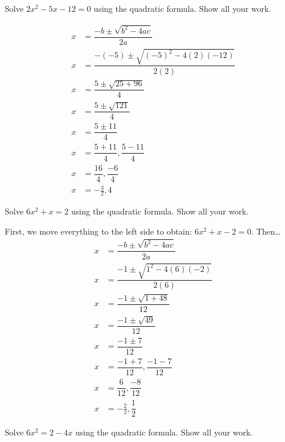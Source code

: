 \documentclass[11pt,letterpaper]{article}
\begin{document}
\newpage





 Solve $2x^2 - 5x - 12= 0$ using the quadratic formula. Show all your work. \pspace

\sol
	\[
	\begin{aligned}
	x&= \dfrac{-b \pm \sqrt{b^2 - 4ac}}{2a} \\[0.3cm]
	x&= \dfrac{-(-5) \pm \sqrt{(-5)^2 - 4(2)(-12)}}{2(2)} \\[0.3cm]
	x&= \dfrac{5 \pm \sqrt{25 + 96}}{4} \\[0.3cm]
	x&= \dfrac{5 \pm \sqrt{121}}{4} \\[0.3cm]
	x&= \dfrac{5 \pm 11}{4} \\[0.3cm]
	x&= \dfrac{5 + 11}{4}, \dfrac{5 - 11}{4} \\[0.3cm]
	x&= \dfrac{16}{4}, \dfrac{-6}{4} \\[0.3cm]
	x&= -\frac{3}{2}, 4
	\end{aligned}
	\] 





\newpage





 Solve $6x^2 + x= 2$ using the quadratic formula. Show all your work. \pspace

\sol First, we move everything to the left side to obtain: $6x^2 + x - 2= 0$. Then\dots
	\[
	\begin{aligned}
	x&= \dfrac{-b \pm \sqrt{b^2 - 4ac}}{2a} \\[0.3cm]
	x&= \dfrac{-1 \pm \sqrt{1^2 - 4(6)(-2)}}{2(6)} \\[0.3cm]
	x&= \dfrac{-1 \pm \sqrt{1 + 48}}{12} \\[0.3cm]
	x&= \dfrac{-1 \pm \sqrt{49}}{12} \\[0.3cm]
	x&= \dfrac{-1 \pm 7}{12} \\[0.3cm]
	x&= \dfrac{-1 + 7}{12}, \dfrac{-1 - 7}{12} \\[0.3cm]
	x&= \dfrac{6}{12}, \dfrac{-8}{12} \\[0.3cm]
	x&= -\frac{2}{3}, \dfrac{1}{2}		
	\end{aligned}
	\] 





\newpage





 Solve $6x^2= 2 - 4x$ using the quadratic formula. Show all your work. \pspace
\end{document}
